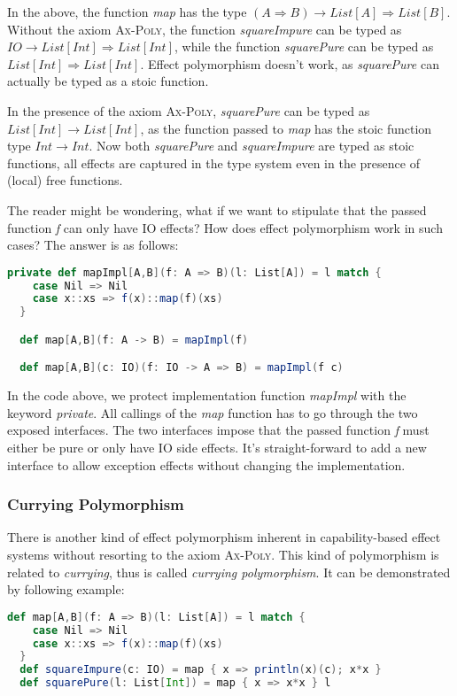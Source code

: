In the above, the function \emph{map} has the type
$(A \Rightarrow B) \to List[A] \Rightarrow List[B]$. Without the axiom
\textsc{Ax-Poly}, the function \emph{squareImpure} can be typed as
$IO \to List[Int] \Rightarrow List[Int]$, while the function
\emph{squarePure} can be typed as $List[Int] \Rightarrow List[Int]$.
Effect polymorphism doesn't work, as \emph{squarePure} can actually be
typed as a stoic function.

In the presence of the axiom \textsc{Ax-Poly}, \emph{squarePure} can
be typed as $List[Int] \to List[Int]$, as the function passed to
\emph{map} has the stoic function type $Int \to Int$. Now both
\emph{squarePure} and \emph{squareImpure} are typed as stoic
functions, all effects are captured in the type system even in the
presence of (local) free functions.

The reader might be wondering, what if we want to stipulate that the
passed function \emph{f} can only have IO effects? How does effect
polymorphism work in such cases? The answer is as follows:

\begin{lstlisting}[language=Scala]
  private def mapImpl[A,B](f: A => B)(l: List[A]) = l match {
    case Nil => Nil
    case x::xs => f(x)::map(f)(xs)
  }

  def map[A,B](f: A -> B) = mapImpl(f)

  def map[A,B](c: IO)(f: IO -> A => B) = mapImpl(f c)
\end{lstlisting}

In the code above, we protect implementation function \emph{mapImpl}
with the keyword \emph{private}.  All callings of the \emph{map}
function has to go through the two exposed interfaces. The two
interfaces impose that the passed function \emph{f} must either be
pure or only have IO side effects. It's straight-forward to add a new
interface to allow exception effects without changing the
implementation.

\subsubsection{Currying Polymorphism}

There is another kind of effect polymorphism inherent in
capability-based effect systems without resorting to the axiom
\textsc{Ax-Poly}. This kind of polymorphism is related to
\emph{currying}, thus is called \emph{currying polymorphism}. It can
be demonstrated by following example:

\begin{lstlisting}[language=Scala]
  def map[A,B](f: A => B)(l: List[A]) = l match {
    case Nil => Nil
    case x::xs => f(x)::map(f)(xs)
  }
  def squareImpure(c: IO) = map { x => println(x)(c); x*x }
  def squarePure(l: List[Int]) = map { x => x*x } l
\end{lstlisting}

